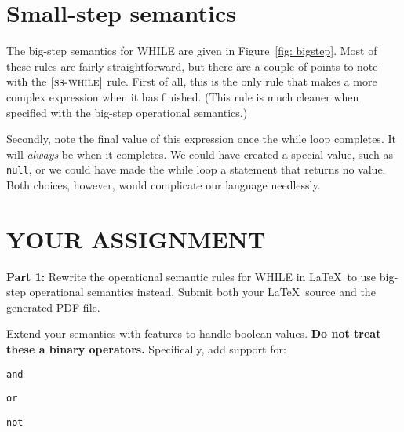 \documentclass{article}
\newcommand{\rel}[1]{ \mbox{\sc [#1]} }
\begin{document}
\section{Small-step semantics}

\newcommand{\bsrule}[3]{
  \rel{#1} &
  \frac{\strut\begin{array}{@{}c@{}} #2 \end{array}}
       {\strut\begin{array}{@{}c@{}} #3 \end{array}}
   \\~\\
}
\newcommand{\bstep}[4]{{#1},{#2} \Downarrow {#3},{#4}}
\newcommand{\ctxt}{C}

The big-step semantics for WHILE are given in Figure~\ref{fig: bigstep}.
%
Most of these rules are fairly straightforward, but there are a couple of points
to note with the $\rel{ss-while}$ rule.
First of all, this is the only rule that makes a more complex expression
when it has finished.
(This rule is much cleaner when specified with the big-step operational semantics.)

Secondly, note the final value of this expression once the while loop completes.
It will \emph{always} be {\false} when it completes.
We could have created a special value, such as {\tt null},
or we could have made the while loop a statement that returns no value.
Both choices, however, would complicate our language needlessly.


\section{YOUR ASSIGNMENT}


\noindent
{\bf Part 1:}
Rewrite the operational semantic rules for WHILE in \LaTeX\
to use big-step operational semantics instead.
Submit both your \LaTeX\ source and the generated PDF file.

Extend your semantics with features to handle boolean values.
{\bf Do not treat these a binary operators.}
Specifically, add support for:
\begin{compactitem}
  \item {\tt and}
  \item {\tt or}
  \item {\tt not}
\end{compactitem}
\end{document}
